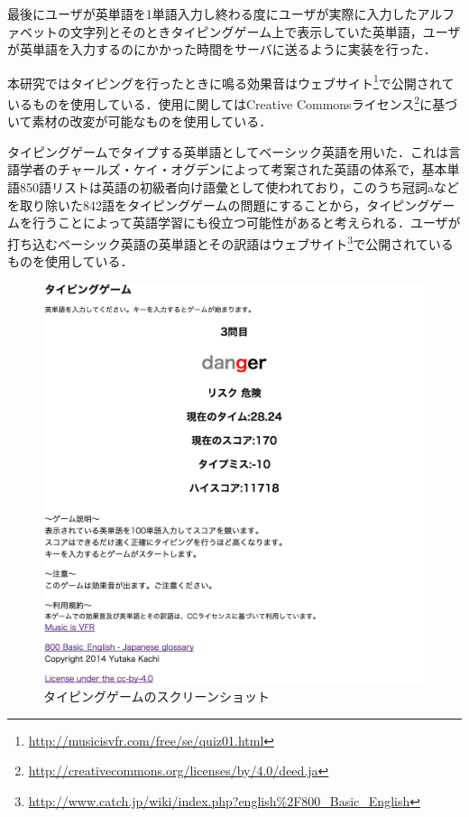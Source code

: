 最後にユーザが英単語を1単語入力し終わる度にユーザが実際に入力したアルファベットの文字列とそのときタイピングゲーム上で表示していた英単語，ユーザが英単語を入力するのにかかった時間をサーバに送るように実装を行った．

本研究ではタイピングを行ったときに鳴る効果音はウェブサイト\footnote{\url{http://musicisvfr.com/free/se/quiz01.html}}で公開されているものを使用している．使用に関してはCreative Commonsライセンス\footnote{\url{http://creativecommons.org/licenses/by/4.0/deed.ja}}に基づいて素材の改変が可能なものを使用している．

タイピングゲームでタイプする英単語としてベーシック英語\cite{simpleenglish}を用いた．これは言語学者のチャールズ・ケイ・オグデンによって考案された英語の体系で，基本単語850語リストは英語の初級者向け語彙として使われており，このうち冠詞aなどを取り除いた842語をタイピングゲームの問題にすることから，タイピングゲームを行うことによって英語学習にも役立つ可能性があると考えられる．ユーザが打ち込むベーシック英語の英単語とその訳語はウェブサイト\footnote{\url{http://www.catch.jp/wiki/index.php?english\%2F800_Basic_English}}で公開されているものを使用している．

\begin{figure}[t]
	\begin{center}
		\includegraphics[width=15cm]{typing_game2.png}
		\caption{タイピングゲームのスクリーンショット}
		\label{LabelExa}
	\end{center}
\end{figure}